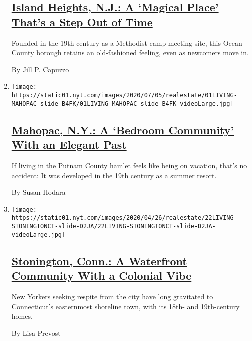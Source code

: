 \begin{enumerate}
  \hypertarget{island-heights-nj-a-magical-place-thats-a-step-out-of-time}{%
  \subsection{\texorpdfstring{\href{/2020/07/08/realestate/island-heights-nj-a-magical-place-thats-a-step-out-of-time.html}{Island
  Heights, N.J.: A `Magical Place' That's a Step Out of
  Time}}{Island Heights, N.J.: A `Magical Place' That's a Step Out of Time}}\label{island-heights-nj-a-magical-place-thats-a-step-out-of-time}}

  Founded in the 19th century as a Methodist camp meeting site, this
  Ocean County borough retains an old-fashioned feeling, even as
  newcomers move in.

  By Jill P. Capuzzo
\item
  \texttt{[image: https://static01.nyt.com/images/2020/07/05/realestate/01LIVING-MAHOPAC-slide-B4FK/01LIVING-MAHOPAC-slide-B4FK-videoLarge.jpg]}

  \hypertarget{mahopac-ny-a-bedroom-community-with-an-elegant-past}{%
  \subsection{\texorpdfstring{\href{/2020/07/01/realestate/mahopac-ny-a-bedroom-community-with-an-elegant-past.html}{Mahopac,
  N.Y.: A `Bedroom Community' With an Elegant
  Past}}{Mahopac, N.Y.: A `Bedroom Community' With an Elegant Past}}\label{mahopac-ny-a-bedroom-community-with-an-elegant-past}}

  If living in the Putnam County hamlet feels like being on vacation,
  that's no accident: It was developed in the 19th century as a summer
  resort.

  By Susan Hodara
\item
  \texttt{[image: https://static01.nyt.com/images/2020/04/26/realestate/22LIVING-STONINGTONCT-slide-D2JA/22LIVING-STONINGTONCT-slide-D2JA-videoLarge.jpg]}

  \hypertarget{stonington-conn-a-waterfront-community-with-a-colonial-vibe}{%
  \subsection{\texorpdfstring{\href{/2020/04/22/realestate/stonington-conn-a-waterfront-community-with-a-colonial-vibe.html}{Stonington,
  Conn.: A Waterfront Community With a Colonial
  Vibe}}{Stonington, Conn.: A Waterfront Community With a Colonial Vibe}}\label{stonington-conn-a-waterfront-community-with-a-colonial-vibe}}

  New Yorkers seeking respite from the city have long gravitated to
  Connecticut's easternmost shoreline town, with its 18th- and
  19th-century homes.

  By Lisa Prevost
\end{enumerate}

